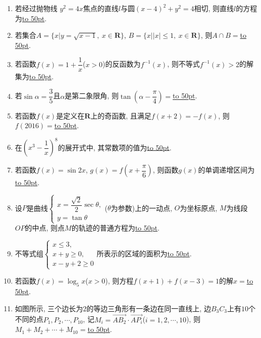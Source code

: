 \documentclass[10pt,a4paper]{article}
\newcommand{\blank}[1]{\underline{\hbox to #1pt{}}}
\begin{document}
\begin{enumerate}[1.]
\begin{center}
\end{center}
\item 若经过抛物线 $y^2=4x$焦点的直线$l$与圆$(x-4)^2+y^2=4$相切, 则直线$l$的方程为\blank{50}.


\item 若集合$A=\{x|y=\sqrt{x-1},\ x\in \mathbf{R}\}$, $B=\{x||x|\le 1,\ x\in \mathbf{R}\}$, 则$A\cap B=$\blank{50}.
\item 若函数$f(x)=1+\dfrac1x$($x>0$)的反函数为$f^{-1}(x)$, 则不等式$f^{-1}(x)>2$的解集为\blank{50}.
\item 若$\sin \alpha =\dfrac35$且$\alpha$是第二象限角, 则$\tan(\alpha -\dfrac\pi 4)=$\blank{50}.
\item 若函数$f(x)$是定义在$\mathbf{R}$上的奇函数, 且满足$f(x+2)=-f(x)$, 则$f(2016)=$\blank{50}.
\item 在$(x^3-\dfrac1x)^8$的展开式中, 其常数项的值为\blank{50}.
\item 若函数$f(x)=\sin 2x$, $g(x)=f(x+\dfrac\pi 6)$, 则函数$g(x)$的单调递增区间为\blank{50}.
\item 设$P$是曲线$\begin{cases} x=\dfrac{\sqrt2}2\sec \theta, \\ y=\tan \theta \end{cases}$($\theta $为参数)上的一动点, $O$为坐标原点, $M$为线段$OP$的中点, 则点$M$的轨迹的普通方程为\blank{50}.
\item 不等式组$\begin{cases} x\le 3, \\ x+y\ge 0, \\ x-y+2 \ge 0 \end{cases}$所表示的区域的面积为\blank{50}.
\item 若函数$f(x)=\log _5 x$($x>0$), 则方程$f(x+1)+f(x-3)=1$的解$x=$\blank{50}.
\item 如图所示, 三个边长为$2$的等边三角形有一条边在同一直线上, 边$B_3C_3$上有$10$个不同的点$P_1,P_2,\cdots,P_{10}$, 记$M_i=\overrightarrow{AB_2}\cdot \overrightarrow{AP_i}$($i=1,2,\cdots,10$), 则$M_1+M_2+\cdots+M_{10}=$\blank{50}.

\end{enumerate}
\end{document}
